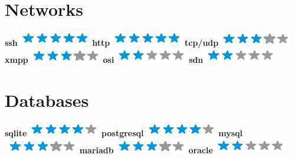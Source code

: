 \documentclass[]{friggeri-cv}
\begin{document}
\begin{aside}
    \section{Networks}
        \textbf{ssh}\includegraphics[scale=0.40]{img/5stars.png}
        \textbf{http}\includegraphics[scale=0.40]{img/5stars.png}
        \textbf{tcp/udp}\includegraphics[scale=0.40]{img/3stars.png}
        \textbf{xmpp}\includegraphics[scale=0.40]{img/3stars.png}
        \textbf{osi}\includegraphics[scale=0.40]{img/2stars.png}
        \textbf{sdn}\includegraphics[scale=0.40]{img/2stars.png}
        ~
    \section{Databases}
        \textbf{sqlite}\includegraphics[scale=0.40]{img/4stars.png}
        \textbf{postgresql}\includegraphics[scale=0.40]{img/4stars.png}
        \textbf{mysql}\includegraphics[scale=0.40]{img/3stars.png}
        \textbf{mariadb}\includegraphics[scale=0.40]{img/3stars.png}
        \textbf{oracle}\includegraphics[scale=0.40]{img/2stars.png}
        ~

\end{aside}
\end{document}
